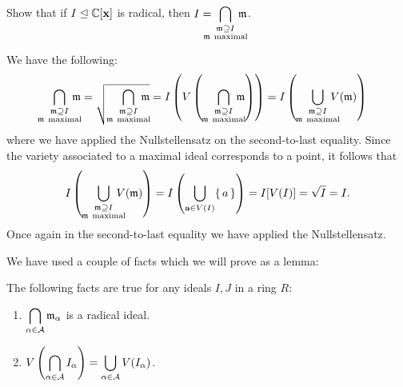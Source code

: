 \documentclass[12pt]{memoir}
\begin{document}
\begin{Ej}[2.3.3]
  Show that if $I\trianglelefteq\mathbb{C}[\mathbf{x}]$ is radical, then $I=\hspace{-1em}\displaystyle\bigcap_{\substack{\mathfrak{m}\supseteq I\\
  \mathfrak{m}\ \text{maximal}}}\hspace{-1em}\mathfrak{m}$.
\end{Ej}
\begin{ptcbr}
 We have the following:
  $$\hspace{-1em}\displaystyle\bigcap_{\substack{\lie m\supseteq I\\
  \lie m\ \text{maximal}}}\hspace{-1em}\lie m
  =\sqrt{\hspace{-0.1em}\displaystyle\bigcap_{\substack{\lie m\supseteq I\\
  \lie m\ \text{maximal}}}\hspace{-1em}\lie m}=I\left(V\left(\hspace{-0.1em}\displaystyle\bigcap_{\substack{\lie m\supseteq I\\
  \lie m\ \text{maximal}}}\hspace{-1em}\lie m\right)\right)=I\left(\hspace{-0.1em}\bigcup_{\substack{\lie m\supseteq I\\
  \lie m\ \text{maximal}}}\hspace{-1em}V(\lie m)\right)$$
  where we have applied the Nullstellensatz on the second-to-last equality. Since the variety associated to a maximal ideal corresponds to a point, it follows that 
  $$I\left(\hspace{-0.1em}\bigcup_{\substack{\mathfrak{m}\supseteq I\\
  \mathfrak{m}\ \text{maximal}}}\hspace{-1em}V(\mathfrak{m})\right)=I\left(\bigcup_{\mathbf{a}\in V(I)}\{\,a\,\}\right)=I[V(I)]=\sqrt I=I.$$
  Once again in the second-to-last equality we have applied the Nullstellensatz.
\end{ptcbr}

We have used a couple of facts which we will prove as a lemma:

\begin{Lem}
The following facts are true for any ideals $I,J$ in a ring $R$:
\begin{enumerate}
  \itemsep=-0.4em
  \item $\displaystyle\bigcap_{\alpha\in\mathcal{A}}\mathfrak{m}_\alpha$ is a radical ideal. %
  \item $\displaystyle V\left(\bigcap_{\alpha\in\mathcal{A}}I_\alpha\right)=\bigcup_{\alpha\in\mathcal{A}}V(I_\alpha)$.
\end{enumerate}
\end{Lem}
\end{document}
